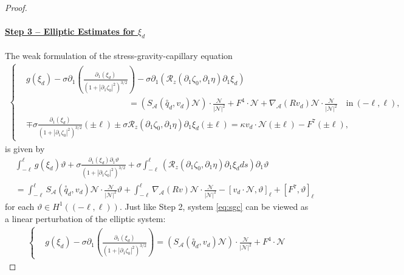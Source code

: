 \documentclass[letterpaper,reqno,10pt,twoside]{amsart}
\theoremstyle{definition}
\theoremstyle{remark}
\def\p{\partial}
\begin{document}
\begin{proof}
		\paragraph{\underline{Step 3 -- Elliptic Estimates for $\xi_{d}$}}
		The weak formulation of the stress-gravity-capillary equation
		\begin{align}\label{eq:sgc}
			\left\{
			\begin{aligned}
				&g(\xi_{d}) - \sigma \p_1 \left( \frac {\p_1(\xi_{d} )} {(1+|\p_1\zeta_0|^2)^{3/2}}\right) -\sigma \partial_{1}(\mathcal{R}_{z}(\partial_{1}\zeta_{0},\partial_{1}\eta)\partial_{1}\xi_{d})\\
				&\qquad\qquad\qquad\qquad\qquad\qquad= \left( S_{\mathcal{A}} (\overset{\circ}q_{d}, v_{d})\mathcal{N}\right)\cdot \frac{\mathcal{N}} {|\mathcal{N}|^2}+F^{4}\cdot \mathcal{N}
				+\nabla_{\mathcal{A}}(Rv_{d})\mathcal{N}\cdot \frac{\mathcal{N}}{|\mathcal{N}|^{2}} \quad \text{in} \ (-\ell, \ell),\\
				&\mp\sigma\frac{\p_1(\xi_{d})}{(1+|\p_1\zeta_0|^2)^{3/2}}(\pm\ell)\pm\sigma \mathcal{R}_{z}(\partial_{1}\zeta_{0},\partial_{1}\eta)\partial_{1}\xi_{d}({\pm\ell})=\kappa v_{d}\cdot \mathcal{N}(\pm\ell)-F^7(\pm\ell),
			\end{aligned}
			\right.
		\end{align}
		is given by
		\begin{equation}\label{eq:w_capillary}
			\begin{aligned}
				&\int_{-\ell}^\ell {g} (\xi_{d}) \vartheta + \sigma \frac{\p_1(\xi_{d}) \p_1\vartheta}{(1+|\p_1\zeta_0|^2)^{3/2}} +\sigma \int_{-\ell}^{\ell}(\mathcal{R}_{z}(\partial_{1}\zeta_{0},\partial_{1}\eta)\partial_{1}\xi_{d} ds)\partial_{1}\vartheta\\
				&=   \int_{-\ell}^\ell S_{\mathcal{A}}(\overset{\circ}q_{d},v_{d})\mathcal{N} \cdot \frac{\mathcal{N}}{|\mathcal{N}|^2} \vartheta+\int_{-\ell}^{\ell}\nabla_{\mathcal{A}}(Rv)\mathcal{N}\cdot \frac{\mathcal{N}}{|\mathcal{N}|^{2}}
				-[ v_{d}\cdot \mathcal{N}, \vartheta]_\ell
				+[F^7, \vartheta]_\ell
			\end{aligned}
		\end{equation}
		for each $\vartheta \in H^1((-\ell, \ell))$. Just like Step 2, system \eqref{eq:sgc} can be viewed as a linear perturbation of the elliptic system:
		\begin{align}\label{eq:sgc1}
			\left\{
			\begin{aligned}
				& g(\xi_{d}) - \sigma \p_1 \left( \frac {\p_1(\xi_{d} )} {(1+|\p_1\zeta_0|^2)^{3/2}}\right)= \left( S_{\mathcal{A}} (\overset{\circ}q_{d}, v_{d})\mathcal{N}\right)\cdot \frac{\mathcal{N}} {|\mathcal{N}|^2}+F^{4}\cdot \mathcal{N}

\end{aligned}
\end{align}
\end{proof}
\end{document}
